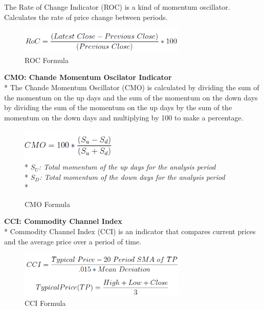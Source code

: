 \documentclass{article}
\begin{document}
The Rate of Change Indicator (ROC) is a kind of momentum oscillator. Calculates the rate of price change between periods.
\begin{figure}[H]
\begin{center}
   \includegraphics[width=80mm,scale=0.8]{assets/formulas/roc.png}
   \caption{ROC Formula}
\end{center}
\end{figure}
\noindent
\textbf{CMO: Chande Momentum Oscilator Indicator} \\*
The Chande Momentum Oscillator (CMO) is calculated by dividing the sum of the momentum on the up days and the sum of the momentum on the down days by dividing the sum of the momentum on the up days by the sum of the momentum on the down days and multiplying by 100 to make a percentage.
\begin{figure}[H]
\begin{center}
   \includegraphics[width=45mm,scale=0.8]{assets/formulas/cmo.png}\\*
   \textit{$S_U$: Total momentum of the up days for the analysis period}\vspace{0.1cm}\\*
   \textit{$S_D$: Total momentum of the down days for the analysis period}\vspace{0.2cm}\\*
   \caption{CMO Formula}
\end{center}
\end{figure}
\noindent
\textbf{CCI: Commodity Channel Index} \\*
Commodity Channel Index (CCI) is an indicator that compares current prices and the average price over a period of time.
\begin{figure}[H]
\begin{center}
   \includegraphics[width=80mm,scale=0.8]{assets/formulas/cci.png}
   \caption{CCI Formula}
\end{center}
\end{figure}
\end{document}
